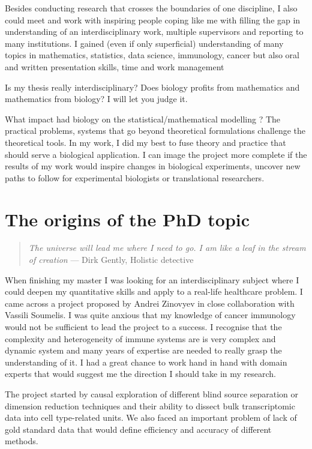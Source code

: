 \documentclass[12pt,]{book}
\theoremstyle{definition}
\theoremstyle{definition}
\theoremstyle{definition}
\theoremstyle{remark}
\begin{document}
Besides conducting research that crosses the boundaries of one
discipline, I also could meet and work with inspiring people coping like
me with filling the gap in understanding of an interdisciplinary work,
multiple supervisors and reporting to many institutions. I gained (even
if only superficial) understanding of many topics in mathematics,
statistics, data science, immunology, cancer but also oral and written
presentation skills, time and work management

Is my thesis really interdisciplinary? Does biology profits from
mathematics and mathematics from biology? I will let you judge it.

What impact had biology on the statistical/mathematical modelling ? The
practical problems, systems that go beyond theoretical formulations
challenge the theoretical tools. In my work, I did my best to fuse
theory and practice that should serve a biological application. I can
image the project more complete if the results of my work would inspire
changes in biological experiments, uncover new paths to follow for
experimental biologists or translational researchers.

\hypertarget{the-origins-of-the-phd-topic}{%
\section*{The origins of the PhD
topic}\label{the-origins-of-the-phd-topic}}

\begin{quote}
\emph{The universe will lead me where I need to go. I am like a leaf in
the stream of creation} --- Dirk Gently, Holistic detective
\end{quote}

When finishing my master I was looking for an interdisciplinary subject
where I could deepen my quantitative skills and apply to a real-life
healthcare problem. I came across a project proposed by Andrei Zinovyev
in close collaboration with Vassili Soumelis. I was quite anxious that
my knowledge of cancer immunology would not be sufficient to lead the
project to a success. I recognise that the complexity and heterogeneity
of immune systems are is very complex and dynamic system and many years
of expertise are needed to really grasp the understanding of it. I had a
great chance to work hand in hand with domain experts that would suggest
me the direction I should take in my research.

The project started by causal exploration of different blind source
separation or dimension reduction techniques and their ability to
dissect bulk transcriptomic data into cell type-related units. We also
faced an important problem of lack of gold standard data that would
define efficiency and accuracy of different methods.
\end{document}
